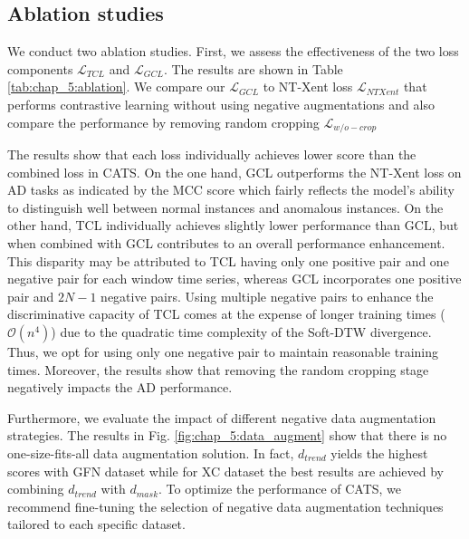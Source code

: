 

\subsection{Ablation studies}

We conduct two ablation studies. First, we assess the effectiveness of the two loss components $\mathcal{L}_{TCL}$ and $\mathcal{L}_{GCL}$. The results are shown in Table \ref{tab:chap_5:ablation}. We compare our $\mathcal{L}_{GCL}$ to NT-Xent loss $\mathcal{L}_{NTXent}$ that performs contrastive learning without using negative augmentations and also compare the performance by removing random cropping $\mathcal{L}_{w/o-crop}$

The results show that each loss individually achieves lower score than the combined loss in CATS. On the one hand, GCL outperforms the NT-Xent loss on AD tasks as indicated by the MCC score which fairly reflects the model's ability to distinguish well between normal instances and anomalous instances. On the other hand, TCL individually achieves slightly lower performance than GCL, but when combined with GCL contributes to an overall performance enhancement. This disparity may be attributed to TCL having only one positive pair and one negative pair for each window time series, whereas GCL incorporates one positive pair and $2N-1$ negative pairs. Using multiple negative pairs to enhance the discriminative capacity of TCL comes at the expense of longer training times ($\mathcal{O}(n^4)$) due to the quadratic time complexity of the Soft-DTW divergence. Thus, we opt for using only one negative pair to maintain reasonable training times. Moreover, the results show that removing the random cropping stage negatively impacts the AD performance. 

Furthermore, we evaluate the impact of different negative data augmentation strategies. The results in Fig. \ref{fig:chap_5:data_augment} show that there is no one-size-fits-all data augmentation solution. In fact, $d_{trend}$ yields the highest scores with GFN dataset while for XC dataset the best results are achieved by combining $d_{trend}$ with $d_{mask}$. To optimize the performance of CATS, we recommend fine-tuning the selection of negative data augmentation techniques tailored to each specific dataset.


